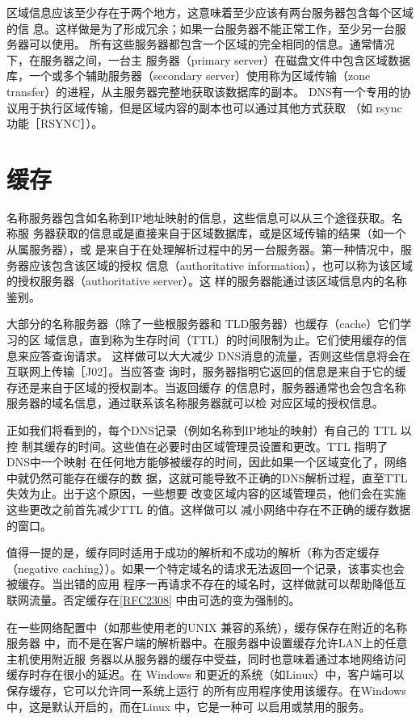 区域信息应该至少存在于两个地方，这意味着至少应该有两台服务器包含每个区域的信
息。这样做是为了形成冗余；如果一台服务器不能正常工作，至少另一台服务器可以使用。
所有这些服务器都包含一个区域的完全相同的信息。通常情况下，在服务器之间，一台主
服务器（primary server）在磁盘文件中包含区域数据库，一个或多个辅助服务器（secondary
server）使用称为区域传输（zone transfer）的进程，从主服务器完整地获取该数据库的副本。
DNS有一个专用的协议用于执行区域传输，但是区域内容的副本也可以通过其他方式获取
（如 rsync 功能［RSYNC］）。

\section{缓存}

名称服务器包含如名称到IP地址映射的信息，这些信息可以从三个途径获取。名称服
务器获取的信息或是直接来自于区域数据库，或是区域传输的结果（如一个从属服务器），或
是来自于在处理解析过程中的另一台服务器。第一种情况中，服务器应该包含该区域的授权
信息（authoritative information），也可以称为该区域的授权服务器（authoritative server）。这
样的服务器能通过该区域信息内的名称鉴别。

大部分的名称服务器（除了一些根服务器和 TLD服务器）也缓存（cache）它们学习的区
域信息，直到称为生存时间（TTL）的时间限制为止。它们使用缓存的信息来应答查询请求。
这样做可以大大减少 DNS消息的流量，否则这些信息将会在互联网上传输［J02］。当应答查
询时，服务器指明它返回的信息是来自于它的缓存还是来自于区域的授权副本。当返回缓存
的信息时，服务器通常也会包含名称服务器的域名信息，通过联系该名称服务器就可以检
对应区域的授权信息。

正如我们将看到的，每个DNS记录（例如名称到IP地址的映射）有自己的 TTL 以控
制其缓存的时间。这些值在必要时由区域管理员设置和更改。TTL 指明了 DNS中一个映射
在任何地方能够被缓存的时间，因此如果一个区域变化了，网络中就仍然可能存在缓存的数
据，这就可能导致不正确的DNS解析过程，直至TTL 失效为止。出于这个原因，一些想要
改变区域内容的区域管理员，他们会在实施这些更改之前首先减少TTL 的值。这样做可以
减小网络中存在不正确的缓存数据的窗口。

值得一提的是，缓存同时适用于成功的解析和不成功的解析（称为否定缓存（negative
caching））。如果一个特定域名的请求无法返回一个记录，该事实也会被缓存。当出错的应用
程序一再请求不存在的域名时，这样做就可以帮助降低互联网流量。否定缓存在\href{https://www.rfc-editor.org/rfc/rfc2308}{[RFC2308]}
中由可选的变为强制的。

在一些网络配置中（如那些使用老的UNIX 兼容的系统），缓存保存在附近的名称服务器
中，而不是在客户端的解析器中。在服务器中设置缓存允许LAN上的任意主机使用附近服
务器以从服务器的缓存中受益，同时也意味着通过本地网络访问缓存时存在很小的延迟。在
Windows 和更近的系统（如Linux）中，客户端可以保存缓存，它可以允许同一系统上运行
的所有应用程序使用该缓存。在Windows 中，这是默认开启的，而在Linux 中，它是一种可
以启用或禁用的服务。

